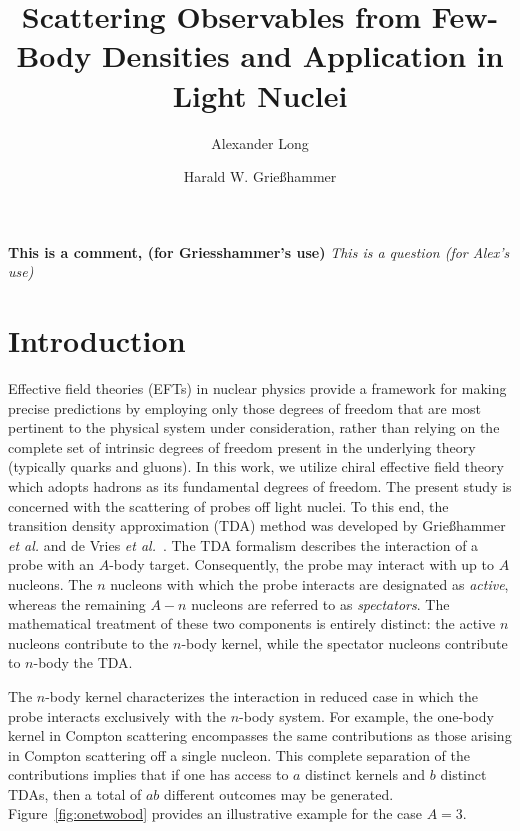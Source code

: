 \documentclass[a4paper,11pt]{article}
\title{Scattering Observables from Few-Body Densities and Application
in Light Nuclei}
\author*{Alexander Long}
\author{Harald W. Grie{\ss}hammer}
\affiliation{Institute for Nuclear Studies, Department of
Physics,\\The George Washington University}
\newcommand{\ques}[1]{\color{red}\textit{ #1 }\color{black}}
\newcommand{\com}[1]{\color{blue}\textbf{ #1 }\color{black}}
\begin{document}
\maketitle
\com{This is a comment, (for Griesshammer's use)}
\ques{This is a question (for Alex's use)}
\section{Introduction}
Effective field theories (EFTs) in nuclear physics provide a
framework for making precise predictions by employing only those
degrees of freedom that are most pertinent to the physical system
under consideration, rather than relying on the complete set of
intrinsic degrees of freedom present in the underlying theory
(typically quarks and gluons). In this work, we utilize chiral
effective field theory which adopts hadrons
as its fundamental degrees of freedom.
The present study is concerned with the scattering of probes off
light nuclei. To this end, the transition density approximation (TDA)
method was developed by Grie\ss hammer \textit{et al.} and de Vries
\textit{et al.}~\cite{hammer2020, Vries2024}. The TDA formalism
describes the interaction of a probe with an $A$-body target.
Consequently, the probe may interact with up to $A$ nucleons. The $n$ nucleons with which the probe
interacts are designated as \textit{active}, whereas the remaining
$A-n$ nucleons are referred to as \textit{spectators}. The
mathematical treatment of these two components is entirely distinct:
the active $n$ nucleons contribute to the $n$-body kernel, while the
spectator nucleons contribute to $n$-body the TDA.

The $n$-body kernel characterizes the interaction in reduced case
in which the probe interacts exclusively with the $n$-body
system. For example, the one-body kernel in Compton scattering
encompasses the same contributions as those arising in Compton
scattering off a single nucleon. This complete separation of the
contributions implies that if one has access to $a$ distinct kernels
and $b$ distinct TDAs, then a total of $ab$ different outcomes may be
generated. Figure~\ref{fig:onetwobod} provides an illustrative
example for the case $A=3$.
\end{document}
